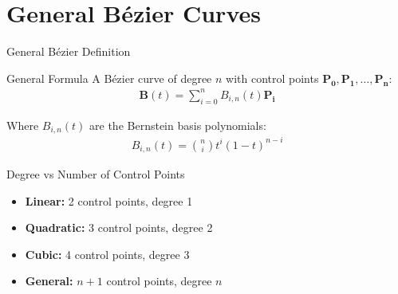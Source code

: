 \section{General Bézier Curves}

\begin{frame}{General Bézier Definition}
  \begin{mathbox}{General Formula}
    \small
    A Bézier curve of degree $n$ with control points $\mathbf{P_0}, \mathbf{P_1}, \ldots, \mathbf{P_n}$:
    \begin{align*}
      \mathbf{B}(t) = \sum_{i=0}^{n} B_{i,n}(t) \mathbf{P_i}
    \end{align*}

    Where $B_{i,n}(t)$ are the Bernstein basis polynomials:
    \begin{align*}
      B_{i,n}(t) = \binom{n}{i} t^i (1-t)^{n-i}
    \end{align*}
  \end{mathbox}

  \begin{conceptbox}{Degree vs Number of Control Points}
    \footnotesize
    \begin{itemize}
      \item \textbf{Linear:} 2 control points, degree 1
      \item \textbf{Quadratic:} 3 control points, degree 2
      \item \textbf{Cubic:} 4 control points, degree 3
      \item \textbf{General:} $n+1$ control points, degree $n$
    \end{itemize}
  \end{conceptbox}
\end{frame}

